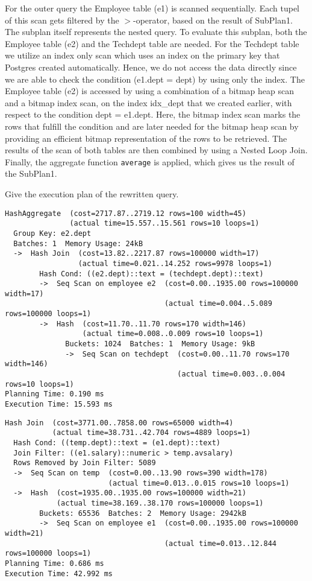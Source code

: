 \documentclass[11pt]{scrartcl}
\begin{document}
    For the outer query the Employee table (e1) is scanned sequentially.
    Each tupel of this scan gets filtered by the $>$-operator, based on the result of SubPlan1.
    The subplan itself represents the nested query.
    To evaluate this subplan, both the Employee table (e2) and the Techdept table are needed.
    For the Techdept table we utilize an index only scan which uses an index on the primary key that Postgres created
    automatically.
    Hence, we do not access the data directly since we are able to check the condition (e1.dept = dept) by using only
    the index.
    The Employee table (e2) is accessed by using a combination of a bitmap heap scan and a bitmap index scan, on the index
    idx\_dept that we created earlier, with respect to the condition dept = e1.dept.
    Here, the bitmap index scan marks the rows that fulfill the condition and are later needed for the bitmap heap scan
    by providing an efficient bitmap representation of the rows to be retrieved.
    The results of the scan of both tables are then combined by using a Nested Loop Join.
    Finally, the aggregate function \texttt{average} is applied, which gives us the result of the SubPlan1.

    Give the execution plan of the rewritten query.

            {\small
    \parskip0pt\begin{verbatim}
HashAggregate  (cost=2717.87..2719.12 rows=100 width=45)
               (actual time=15.557..15.561 rows=10 loops=1)
  Group Key: e2.dept
  Batches: 1  Memory Usage: 24kB
  ->  Hash Join  (cost=13.82..2217.87 rows=100000 width=17)
                 (actual time=0.021..14.252 rows=9978 loops=1)
        Hash Cond: ((e2.dept)::text = (techdept.dept)::text)
        ->  Seq Scan on employee e2  (cost=0.00..1935.00 rows=100000 width=17)
                                     (actual time=0.004..5.089 rows=100000 loops=1)
        ->  Hash  (cost=11.70..11.70 rows=170 width=146)
                  (actual time=0.008..0.009 rows=10 loops=1)
              Buckets: 1024  Batches: 1  Memory Usage: 9kB
              ->  Seq Scan on techdept  (cost=0.00..11.70 rows=170 width=146)
                                        (actual time=0.003..0.004 rows=10 loops=1)
Planning Time: 0.190 ms
Execution Time: 15.593 ms
    \end{verbatim}}

            {\small
    \parskip0pt\begin{verbatim}
Hash Join  (cost=3771.00..7858.00 rows=65000 width=4)
           (actual time=38.731..42.704 rows=4889 loops=1)
  Hash Cond: ((temp.dept)::text = (e1.dept)::text)
  Join Filter: ((e1.salary)::numeric > temp.avsalary)
  Rows Removed by Join Filter: 5089
  ->  Seq Scan on temp  (cost=0.00..13.90 rows=390 width=178)
                        (actual time=0.013..0.015 rows=10 loops=1)
  ->  Hash  (cost=1935.00..1935.00 rows=100000 width=21)
            (actual time=38.169..38.170 rows=100000 loops=1)
        Buckets: 65536  Batches: 2  Memory Usage: 2942kB
        ->  Seq Scan on employee e1  (cost=0.00..1935.00 rows=100000 width=21)
                                     (actual time=0.013..12.844 rows=100000 loops=1)
Planning Time: 0.686 ms
Execution Time: 42.992 ms
    \end{verbatim}}
\end{document}
